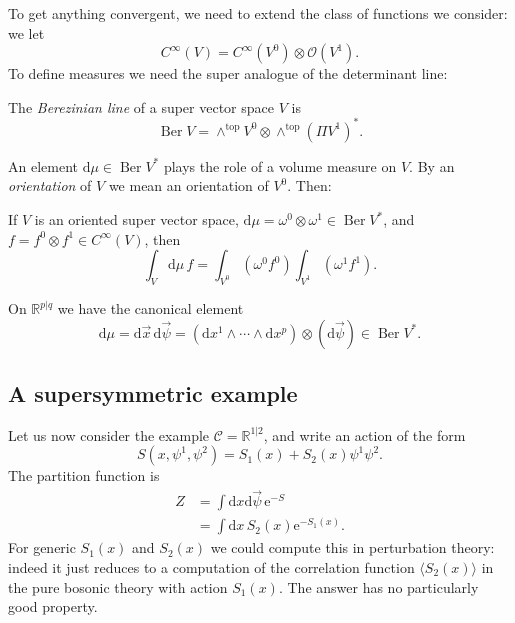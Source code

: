 \documentclass[12pt,letterpaper,reqno]{article}
\numberwithin{equation}{section}
\newcommand{\cC}{\ensuremath{\mathcal C}}
\newcommand{\cO}{\ensuremath{\mathcal O}}
\newcommand{\R}{\ensuremath{\mathbb R}}
\newcommand{\e}{{\mathrm e}}
\newcommand{\de}{\mathrm{d}}
\newcommand{\rmtop}{\mathrm{top}}
\newcommand{\IP}[1]{\langle#1\rangle}
\newcommand{\ti}[1]{\textit{#1}}
\DeclareMathOperator{\Ber}{Ber}
\begin{document}
To get anything convergent,
we need to extend the class of functions we consider:
we let
\begin{equation}
  C^\infty(V) = C^\infty(V^0) \otimes \cO(V^1).
\end{equation}
To define measures we need 
the super analogue of the determinant line:
\begin{defn}
The \ti{Berezinian line} of a super vector space $V$ is
\begin{equation}
  \Ber V = \wedge^\rmtop V^0 \otimes \wedge^\rmtop (\Pi V^1)^*.
\end{equation}
\end{defn}
An element $\de \mu \in \Ber V^*$ plays the role of a volume measure
on $V$. By an \ti{orientation} of $V$ we mean an orientation of $V^0$.
Then:
\begin{defn} If $V$ is an oriented 
super vector space, $\de \mu = \omega^0 \otimes \omega^1 \in \Ber V^*$,
and $f = f^0 \otimes f^1 \in C^\infty(V)$, then
\begin{equation}
    \int_V \de \mu \, f = \int_{V^0} \left( \omega^0 f^0 \right) \int_{V^1} \left( \omega^1 f^1 \right).
\end{equation}
\end{defn}
On $\R^{p \vert q}$ we have the canonical element
\begin{equation}
  \de \mu = \de \vec{x} \, \de \vec{\psi} = (\de x^1 \wedge \cdots \wedge \de x^p) \otimes (\de \vec\psi) \in \Ber V^*.
\end{equation}


\subsection{A supersymmetric example}

Let us now consider the example $\cC = \R^{1 \vert 2}$, and write an action
of the form
\begin{equation} \label{eq:r21-action-generic}
  S(x, \psi^1, \psi^2) = S_1(x) + S_2(x) \psi^1 \psi^2.
\end{equation}
The partition function is
\begin{align}
  Z &= \int \de x \de \vec\psi \, \e^{-S} \\
  &= \int \de x \, S_2(x) \e^{-S_1(x)}.
\end{align}
For generic $S_1(x)$ and $S_2(x)$
we could compute this in perturbation theory:
indeed it just reduces to a computation of the correlation
function $\IP{S_2(x)}$ in 
the pure bosonic theory with action $S_1(x)$.
The answer has no particularly good property.
\end{document}

